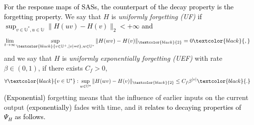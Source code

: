 \documentclass[journal,twoside,web]{ieeecolor}
\newtheorem{Remark}[Theorem]{Remark}
\begin{document}
     \textcolor{black}{For the response 
     maps of SASs, the counterpart  of the decay property is the  forgetting property. }
      We say that $H$ is \emph{uniformly forgetting (UF)}
      \textcolor{black}{if $\sup_{v \in \mathbb{U}^{*},u \in \mathbb{U}}\|H(uv)-H(v)\|_2 < +\infty$ and}
       \begin{equation}
       \label{def:uf}
       \lim_{t \rightarrow \infty} \sup_{\textcolor{black}{v \in \mathbb{U}^{+}, |v|=t}, w \in \mathbb{U}^{*}} \|H(wv)-H(v)\|_{\textcolor{black}{2}}=0\textcolor{black}{,}
       \end{equation}
       and we say that $H$ is \emph{uniformly exponentially forgetting (UEF)} with rate $\beta \in (0,1)$, if there exists $C_{f} > 0$, %
       \begin{equation}
       \label{def:uef}
       \forall \textcolor{black}{v \in \mathbb{U}^{*}}:  \sup_{w \in \mathbb{U}^{*}} \|H(wv)-H(v)\|_{\textcolor{black}{2}} \le C_f \beta^{|v|}\textcolor{black}{.} 
       \end{equation}
      \textcolor{black}{(Exponential)} forgetting  means that the influence of earlier inputs on the current output \textcolor{black}{(exponentially)} fades with time, and it 
      \textcolor{black}{relates to decaying properties of $\Psi_H$ as follows.}
\end{document}
